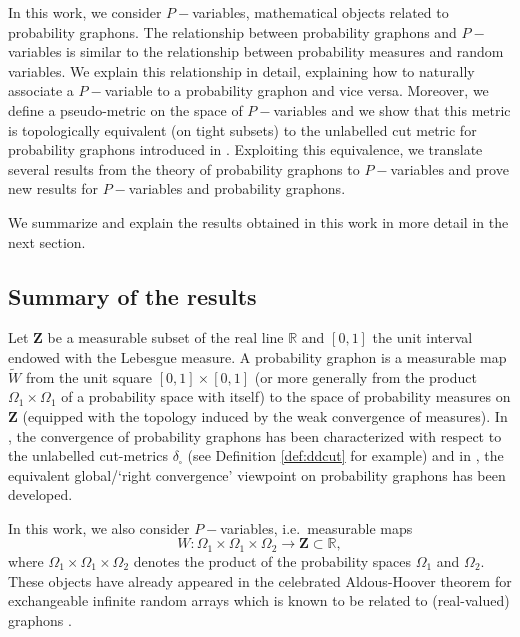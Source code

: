 \documentclass[11pt]{article}
\def\R{\mathbb{R}}
\newcommand{\Space}{\mathbf{Z}}
\begin{document}
In this work, we consider $P-$variables, mathematical objects related to probability graphons. The relationship between probability graphons and $P-$variables is similar to the relationship between probability measures and random variables. We explain this relationship in detail, explaining how to naturally associate a $P-$variable to a probability graphon and vice versa.
Moreover, we define a pseudo-metric on the space of $P-$variables and we show that this metric is topologically equivalent (on tight subsets) to the unlabelled cut metric for probability graphons introduced in \cite{abraham2023probabilitygraphons}. Exploiting this equivalence, we translate several results from the theory of probability graphons to $P-$variables and prove new results for $P-$variables and probability graphons.

We summarize and explain the results obtained in this work in more detail in the next section.

\subsection{Summary of the results}
Let $\Space$ be a measurable subset of the real line $\R$ and $[0,1]$ the unit interval endowed with the Lebesgue measure. A probability graphon is a measurable map $\widetilde{W}$ from the unit square $[0,1]\times [0,1]$ (or more generally from the product $\Omega_1\times \Omega_1$ of a probability space with itself) to the space of probability measures on $\Space$ (equipped with the topology induced by the weak convergence of measures). In \cite{abraham2023probabilitygraphons}, the convergence of probability graphons has been characterized with respect to the unlabelled cut-metrics $\delta_{\square}$ (see Definition \ref{def:ddcut} for example) and in \cite{zucal2024probabilitygraphonsrightconvergence}, the equivalent global/`right convergence' viewpoint on probability graphons has been developed. 

In this work, we also consider $P-$variables, i.e.\ measurable maps 
$$
W:\Omega_1 \times \Omega_1 \times \Omega_2 \rightarrow \Space\subset \R,
$$
where $\Omega_1\times \Omega_1\times \Omega_2$ denotes the product of the probability spaces $\Omega_1$ and $\Omega_2.$ These objects have already appeared in the celebrated Aldous-Hoover theorem for exchangeable infinite random arrays \cite{aldous1981representations,aldous2010exchangeability,hoover1979relations,austin2008exchangeable} which is known to be related to (real-valued) graphons \cite{austin2008exchangeable,diaconis2007graph,aldous2010exchangeability}.    
\end{document}
